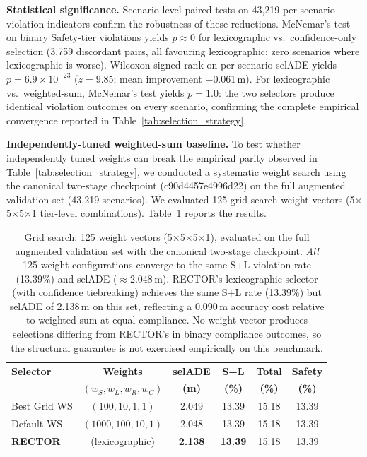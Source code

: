 \noindent\textbf{Statistical significance.}  Scenario-level paired tests on 43{,}219 per-scenario violation indicators confirm the robustness of these reductions.  McNemar's test on binary Safety-tier violations yields $p \approx 0$ for lexicographic vs.\ confidence-only selection (3{,}759 discordant pairs, all favouring lexicographic; zero scenarios where lexicographic is worse).  Wilcoxon signed-rank on per-scenario selADE yields $p = 6.9 \times 10^{-23}$ ($z = 9.85$; mean improvement $-$0.061\,m).  For lexicographic vs.\ weighted-sum, McNemar's test yields $p = 1.0$: the two selectors produce identical violation outcomes on every scenario, confirming the complete empirical convergence reported in Table~\ref{tab:selection_strategy}.

\noindent\textbf{Independently-tuned weighted-sum baseline.}
To test whether independently tuned weights can break the empirical parity observed in Table~\ref{tab:selection_strategy}, we conducted a systematic weight search using the canonical two-stage checkpoint (c90d4457e4996d22) on the full augmented validation set (43{,}219 scenarios).  We evaluated 125 grid-search weight vectors (5$\times$5$\times$5$\times$1 tier-level combinations).  Table~\ref{tab:ws_independent} reports the results.

\begin{table}[t]
\centering
\caption{Independently-Tuned Weighted-Sum vs.\ RECTOR (Protocol~A, 43{,}219 scenarios, canonical checkpoint)}
\label{tab:ws_independent}
\setlength{\tabcolsep}{3pt}
\begin{tabular}{lccccc}
\toprule
\textbf{Selector} & \textbf{Weights} & \textbf{selADE} & \textbf{S+L} & \textbf{Total} & \textbf{Safety} \\
 & $(w_S, w_L, w_R, w_C)$ & \textbf{(m)} & \textbf{(\%)} & \textbf{(\%)} & \textbf{(\%)} \\
\midrule
Best Grid WS     & $(100,10,1,1)$         & 2.049 & 13.39 & 15.18 & 13.39 \\
Default WS       & $(1000,100,10,1)$      & 2.048 & 13.39 & 15.18 & 13.39 \\
\midrule
\textbf{RECTOR}  & (lexicographic)        & \textbf{2.138} & \textbf{13.39} & 15.18 & 13.39 \\
\bottomrule
\end{tabular}
\vspace{1mm}
\caption*{\footnotesize Grid search: 125 weight vectors (5$\times$5$\times$5$\times$1), evaluated on the full augmented validation set with the canonical two-stage checkpoint.  \emph{All} 125 weight configurations converge to the same S+L violation rate (13.39\%) and selADE ($\approx$2.048\,m).  RECTOR's lexicographic selector (with confidence tiebreaking) achieves the same S+L rate (13.39\%) but selADE of 2.138\,m on this set, reflecting a 0.090\,m accuracy cost relative to weighted-sum at equal compliance.  No weight vector produces selections differing from RECTOR's in binary compliance outcomes, so the structural guarantee is not exercised empirically on this benchmark.}
\end{table}


